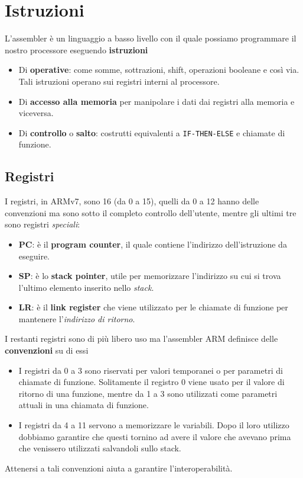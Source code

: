 \section{Istruzioni}
L'assembler è un linguaggio a basso livello con il quale possiamo programmare il nostro processore
eseguendo \textbf{istruzioni}
\begin{itemize}
	\item Di \textbf{operative}: come somme, sottrazioni, shift, operazioni booleane e così via.
	      Tali istruzioni operano sui registri interni al processore.
	\item Di \textbf{accesso alla memoria} per manipolare i dati dai registri alla memoria e
	      viceversa.
	\item Di \textbf{controllo} o \textbf{salto}: costrutti equivalenti a \verb|IF-THEN-ELSE| e
	      chiamate di funzione.
\end{itemize}

\subsection{Registri}
I registri, in ARMv7, sono 16 (da 0 a 15), quelli da 0 a 12 hanno delle convenzioni ma sono sotto
il completo controllo dell'utente, mentre gli ultimi tre sono registri \emph{speciali}:
\begin{itemize}
	\item \textbf{PC}: è il \textbf{program counter}, il quale contiene l'indirizzo dell'istruzione
	      da eseguire.
	\item \textbf{SP}: è lo \textbf{stack pointer}, utile per memorizzare l'indirizzo su cui si
	      trova l'ultimo elemento inserito nello \emph{stack}.
	\item \textbf{LR}: è il \textbf{link register} che viene utilizzato per le chiamate di funzione
	      per mantenere l'\emph{indirizzo di ritorno}.
\end{itemize}
I restanti registri sono di più libero uso ma l'assembler ARM definisce delle \textbf{convenzioni}
su di essi
\begin{itemize}
	\item I registri da 0 a 3 sono riservati per valori temporanei o per parametri di chiamate di
	      funzione. Solitamente il registro 0 viene usato per il valore di ritorno di una funzione,
	      mentre da 1 a 3 sono utilizzati come parametri attuali in una chiamata di funzione.
	\item I registri da 4 a 11 servono a memorizzare le variabili. Dopo il loro utilizzo dobbiamo
	      garantire che questi tornino ad avere il valore che avevano prima che venissero
	      utilizzati salvandoli sullo stack.
\end{itemize}
Attenersi a tali convenzioni aiuta a garantire l'interoperabilità.

